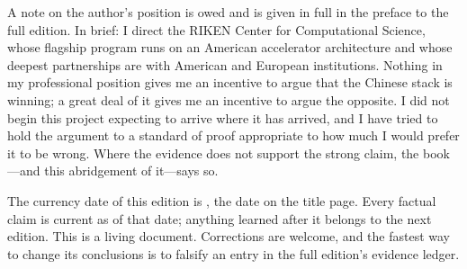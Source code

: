 A note on the author's position is owed and is given in full in the preface to the full edition. In brief: I direct the RIKEN Center for Computational Science, whose flagship program runs on an American accelerator architecture and whose deepest partnerships are with American and European institutions. Nothing in my professional position gives me an incentive to argue that the Chinese stack is winning; a great deal of it gives me an incentive to argue the opposite. I did not begin this project expecting to arrive where it has arrived, and I have tried to hold the argument to a standard of proof appropriate to how much I would prefer it to be wrong. Where the evidence does not support the strong claim, the book---and this abridgement of it---says so.

The currency date of this edition is \datafreeze, the date on the title page. Every factual claim is current as of that date; anything learned after it belongs to the next edition. This is a living document. Corrections are welcome, and the fastest way to change its conclusions is to falsify an entry in the full edition's evidence ledger.
